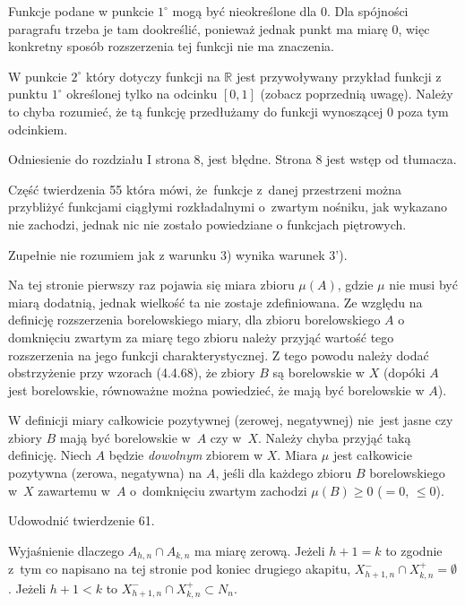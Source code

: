 \documentclass[a4paper,11pt]{article}
\begin{document}
\start {} Funkcje podane w punkcie $1^{ \circ }$ mogą być
nieokreślone dla 0. Dla spójności paragrafu trzeba je tam dookreślić,
ponieważ jednak punkt ma miarę 0, więc konkretny sposób rozszerzenia
tej funkcji nie ma znaczenia.

\start {} W punkcie $2^{ \circ }$ który dotyczy funkcji na
$\mathbb{R}$ jest przywoływany przykład funkcji z punktu $1^{ \circ }$
określonej tylko na odcinku $[ 0, 1 ]$ (zobacz poprzednią uwagę).
Należy to chyba rozumieć, że tą funkcję przedłużamy do funkcji
wynoszącej 0 poza tym odcinkiem.

\start {} Odniesienie do rozdziału I strona 8, jest błędne.
Strona 8 jest wstęp od tłumacza.

\start {} Część twierdzenia 55 która mówi, że~funkcje z~danej
przestrzeni można przybliżyć funkcjami ciągłymi rozkładalnymi
o~zwartym nośniku, jak wykazano nie zachodzi, jednak nic nie zostało
powiedziane o funkcjach piętrowych.

\start {} Zupełnie nie rozumiem jak z warunku 3) wynika warunek
3').

\start {} Na tej stronie pierwszy raz pojawia się miara zbioru
$\mu( A )$, gdzie $\mu$ nie musi być miarą dodatnią, jednak wielkość
ta nie zostaje zdefiniowana. Ze względu na definicję rozszerzenia
borelowskiego miary, dla zbioru borelowskiego $A$ o domknięciu zwartym
za miarę tego zbioru należy przyjąć wartość tego rozszerzenia na jego
funkcji charakterystycznej. Z tego powodu należy dodać obstrzyżenie
przy wzorach (4.4.68), że zbiory $B$ są borelowskie w $X$ (dopóki $A$
jest borelowskie, równoważne można powiedzieć, że mają być borelowskie
w $A$).

\start {} W definicji miary całkowicie pozytywnej (zerowej,
negatywnej) nie~jest jasne czy zbiory $B$ mają być borelowskie w~$A$
czy w~$X$. Należy chyba przyjąć taką definicję. Niech $A$ będzie
\emph{dowolnym} zbiorem w $X$. Miara $\mu$ jest całkowicie pozytywna
(zerowa, negatywna) na $A$, jeśli dla każdego zbioru $B$ borelowskiego
w~$X$ zawartemu w~$A$ o~domknięciu zwartym zachodzi $\mu( B ) \geq 0$
($= 0$, $\leq 0$).

\start {} Udowodnić twierdzenie 61.
  
\start {} Wyjaśnienie dlaczego $A_{ h, n } \cap A_{ k, n }$ ma
miarę zerową. Jeżeli $h + 1 = k$ to zgodnie z~tym co napisano na tej
stronie pod koniec drugiego akapitu,
$X^{ - }_{ h + 1, n } \cap X^{ + }_{ k, n } = \emptyset$. Jeżeli
$h + 1 < k$ to
$X^{ - }_{ h + 1, n } \cap X^{ + }_{ k, n } \subset N_{ n }$.
  
\end{document}

